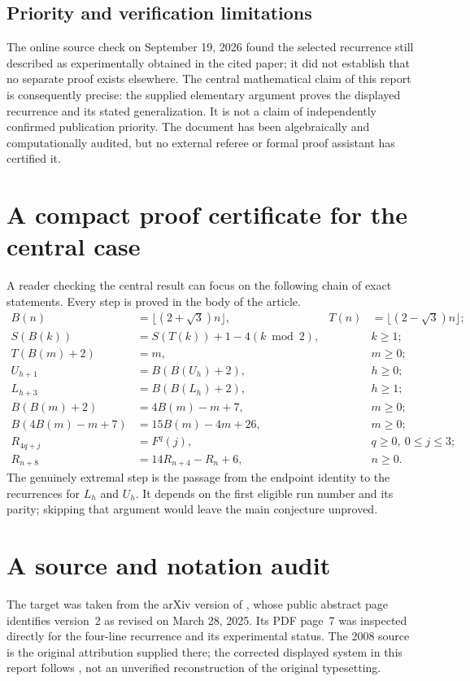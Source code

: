 \documentclass[11pt]{article}
\theoremstyle{definition}
\numberwithin{equation}{section}
\begin{document}
\subsection{Priority and verification limitations}
The online source check on September 19, 2026 found the selected recurrence still described as experimentally obtained in the cited paper; it did not establish that no separate proof exists elsewhere. The central mathematical claim of this report is consequently precise: the supplied elementary argument proves the displayed recurrence and its stated generalization. It is not a claim of independently confirmed publication priority. The document has been algebraically and computationally audited, but no external referee or formal proof assistant has certified it.

\appendix
\section{A compact proof certificate for the central case}\label{app:certificate}
A reader checking the central result can focus on the following chain of exact statements. Every step is proved in the body of the article.
\begin{align*}
 B(n)&=\lfloor(2+\sqrt3)n\rfloor,
 &T(n)&=\lfloor(2-\sqrt3)n\rfloor;\\
 S(B(k))&=S(T(k))+1-4(k\bmod2),&&k\ge1;\\
 T(B(m)+2)&=m,&&m\ge0;\\
 U_{h+1}&=B(B(U_h)+2),&&h\ge0;\\
 L_{h+3}&=B(B(L_h)+2),&&h\ge1;\\
 B(B(m)+2)&=4B(m)-m+7,&&m\ge0;\\
 B(4B(m)-m+7)&=15B(m)-4m+26,&&m\ge0;\\
 R_{4q+j}&=F^q(j),&&q\ge0,\ 0\le j\le3;\\
 R_{n+8}&=14R_{n+4}-R_n+6,&&n\ge0.
\end{align*}
The genuinely extremal step is the passage from the endpoint identity to the recurrences for $L_h$ and $U_h$. It depends on the first eligible run number and its parity; skipping that argument would leave the main conjecture unproved.

\section{A source and notation audit}\label{app:audit}
The target was taken from the arXiv version of \cite{BF}, whose public abstract page identifies version~2 as revised on March 28, 2025. Its PDF page~7 was inspected directly for the four-line recurrence and its experimental status. The 2008 source \cite{ARL} is the original attribution supplied there; the corrected displayed system in this report follows \cite{BF}, not an unverified reconstruction of the original typesetting.
\end{document}
